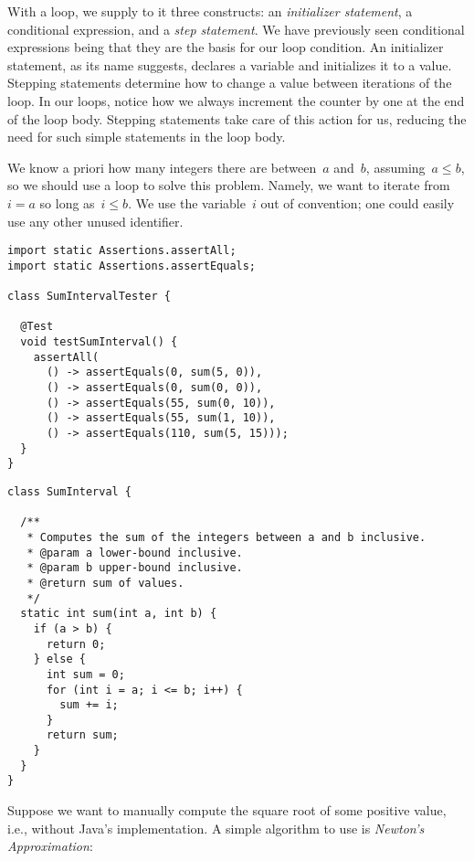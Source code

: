 With a  loop, we supply to it three constructs: an \emph{initializer statement}, a conditional expression, and a \emph{step statement}.
We have previously seen conditional expressions being that they are the basis for our  loop condition. 
An initializer statement, as its name suggests, declares a variable and initializes it to a value. 
Stepping statements determine how to change a value between iterations of the loop. 
In our  loops, notice how we always increment the counter by one at the end of the loop body. 
Stepping statements take care of this action for us, reducing the need for such simple statements in the loop body.

We know a priori how many integers there are between~$a$ and~$b$, assuming~$a \leq b$, so we should use a  loop to solve this problem.
Namely, we want to iterate from~$i = a$ so long as~$i \leq b$. 
We use the variable~$i$ out of convention; one could easily use any other unused identifier.

\enlargethispage{1\baselineskip}
\begin{lstlisting}[language=MyJava]
import static Assertions.assertAll;
import static Assertions.assertEquals;

class SumIntervalTester {

  @Test
  void testSumInterval() {
    assertAll(
      () -> assertEquals(0, sum(5, 0)),
      () -> assertEquals(0, sum(0, 0)),
      () -> assertEquals(55, sum(0, 10)),
      () -> assertEquals(55, sum(1, 10)),
      () -> assertEquals(110, sum(5, 15)));
  }
}
\end{lstlisting}

\begin{lstlisting}[language=MyJava]
class SumInterval {

  /**
   * Computes the sum of the integers between a and b inclusive.
   * @param a lower-bound inclusive.
   * @param b upper-bound inclusive.
   * @return sum of values.
   */
  static int sum(int a, int b) {
    if (a > b) { 
      return 0; 
    } else {
      int sum = 0;
      for (int i = a; i <= b; i++) { 
        sum += i; 
      }
      return sum;
    }
  }
}
\end{lstlisting}

Suppose we want to manually compute the square root of some positive value, i.e., without Java's implementation. 
A simple algorithm to use is \emph{Newton's Approximation}:


